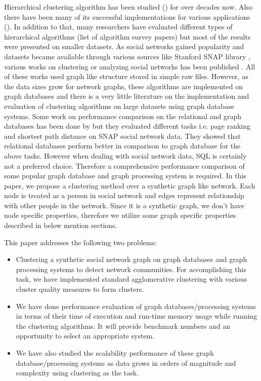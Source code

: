 \documentclass[11pt,onecolumn]{article}
\begin{document}
Hierarchical clustering algorithm has been studied (\cite{WillHerb}\cite{Chris}\cite{CFO}) for over decades now. Also there have been many of its successful implementations for various applications (\cite{SteinKar}\cite{ZhaoKar}). In addition to that, many researchers have evaluated different types of hierarchical algorithms (list of algorithm survey papers) but most of the results were presented on smaller datasets. 
As social networks gained popularity and datasets became available through various sources like Stanford SNAP library \cite{snap}, various works on clustering or analyzing social networks has been published \cite{MishraSchrei}\cite{Held}. All of these works used graph like structure stored in simple raw files. However, as the data sizes grow for network graphs, these algorithms are implemented on graph databases and there is a very little literature \cite{GuhaRat} on the implementation and evaluation of clustering algorithms on large datasets using graph database systems. 
Some work on performance comparison on the relational and graph databases has been done by \cite{benchmark} but they evaluated different tasks i.e. page ranking and shortest path distance on SNAP social network data. They showed that relational databases perform better in comparison to graph database for the above tasks. However when dealing with social network data, SQL is certainly not a preferred choice. Therefore a comprehensive performance comparison of some popular graph database and graph processing system is required.
In this paper, we propose a clustering method over a synthetic graph like network. Each node is treated as a person in social network and edges represent relationship with other people in the network. Since it is a synthetic graph, we don’t have node specific properties, therefore we utilize some graph specific properties described in below mention sections.

This paper addresses the following two problems:
\begin{itemize}
\item
Clustering a synthetic social network graph on graph databases and graph processing systems to detect network communities. For accomplishing this task, we have implemented standard agglomerative clustering with various cluster quality measures to form clusters.
\item
We have done performance evaluation of graph databases/processing systems in terms of their time of execution and run-time memory usage while running the clustering algorithms. It will provide benchmark numbers and an opportunity to select an appropriate system.
\item
We have also studied the scalability performance of these graph database/processing systems as data grows in orders of magnitude and complexity using clustering as the task.
\end{itemize}
\end{document}
